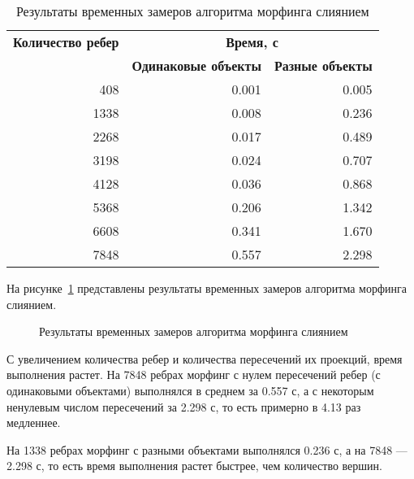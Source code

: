 \begin{table}[ht]
	\small
	\begin{center}
		\begin{threeparttable}
			\caption{Результаты временных замеров алгоритма морфинга слиянием}
			\label{tbl:res1}
			\begin{tabular}{|r|r|r|}
				\hline
				\bfseries Количество ребер & \multicolumn{2}{c|}{\bfseries Время, с} \\
				\cline{2-3}
				& \bfseries Одинаковые объекты & \bfseries Разные объекты \\
				\hline
				408 & 0.001 & 0.005 \\
				\hline
				1338 & 0.008 & 0.236 \\
				\hline
				2268 & 0.017 & 0.489 \\
				\hline
				3198 & 0.024 & 0.707 \\
				\hline
				4128 & 0.036 & 0.868 \\
				\hline
				5368 & 0.206 & 1.342 \\
				\hline
				6608 & 0.341 & 1.670 \\
				\hline
				7848 & 0.557 & 2.298 \\
				\hline
			\end{tabular}
		\end{threeparttable}
	\end{center}
\end{table}


На рисунке~\ref{img:cpu_times} представлены результаты временных замеров алгоритма морфинга слиянием.

\begin{figure}[h]
	\centering
	
	\caption{Результаты временных замеров алгоритма морфинга слиянием}
	\label{img:cpu_times}
\end{figure}

\pagebreak

С увеличением количества ребер и количества пересечений их проекций, время выполнения растет. На 7848 ребрах морфинг с нулем пересечений ребер (с одинаковыми объектами) выполнялся в среднем за 0.557 с, а с некоторым ненулевым числом пересечений за 2.298 с, то есть примерно в 4.13 раз медленнее.

На 1338 ребрах морфинг с разными объектами выполнялся 0.236 с, а на 7848 --- 2.298 с, то есть время выполнения растет быстрее, чем количество вершин.

